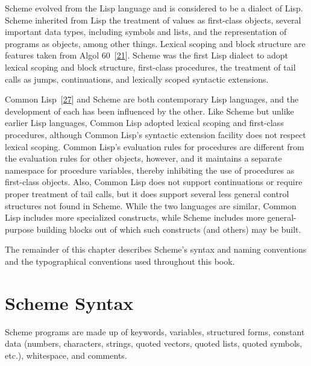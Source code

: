 Scheme evolved from the \label{intro_s26}Lisp language and is considered to be a
dialect of Lisp.
Scheme inherited from Lisp the treatment of values as first-class
objects, several important data types, including symbols and lists,
and the representation of programs as objects, among other things.
Lexical scoping and block structure are features taken from
\label{intro_s27}Algol 60 [\hyperref[bibliography_g239]{21}].
Scheme was the first Lisp dialect to adopt lexical scoping and block
structure, first-class procedures, the treatment of tail
calls as jumps, continuations, and lexically scoped syntactic
extensions.


\label{intro_s28}Common Lisp [\hyperref[bibliography_g245]{27}] and Scheme are both contemporary Lisp
languages, and the development of each has been influenced by the other.
Like Scheme but unlike earlier Lisp languages, Common Lisp
adopted lexical scoping and first-class procedures, although
Common Lisp's syntactic extension facility does not
respect lexical scoping.
Common Lisp's evaluation rules for procedures are different
from the evaluation rules for other objects, however, and it maintains a
separate namespace for procedure variables, thereby inhibiting
the use of procedures as first-class objects.
Also, Common Lisp does not support continuations or require proper
treatment of tail calls,
but it does support several less general control structures not found
in Scheme.
While the two languages are similar, Common
Lisp includes more specialized constructs, while Scheme includes
more general-purpose building blocks out of which such constructs (and
others) may be built.


The remainder of this chapter describes Scheme's syntax and naming
conventions and the typographical conventions used throughout this
book.


\section{\label{intro_g1}\label{intro_h1}Scheme Syntax\label{intro_SECTINTROSYNTAX}}



Scheme programs are made up of keywords, variables, \label{intro_s29}structured forms,
constant data (numbers, characters, strings, quoted vectors, quoted
lists, quoted symbols, etc.), whitespace, and comments.


